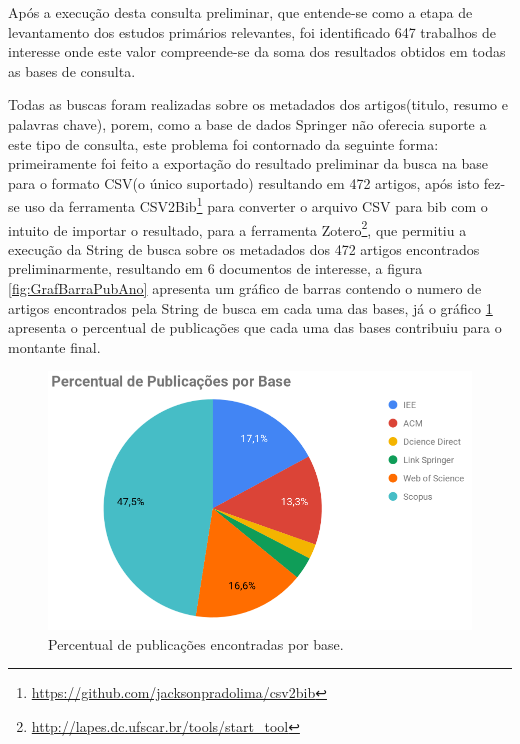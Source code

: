 \documentclass[tid,table]{texufpel} %
\begin{document}
Após a execução desta consulta preliminar, que entende-se como a etapa de levantamento dos estudos primários relevantes, foi identificado 647 trabalhos de interesse onde este valor  compreende-se da soma dos resultados obtidos em todas as bases de consulta.

Todas as buscas foram realizadas sobre os metadados dos artigos(titulo, resumo e palavras chave), porem, como a base de dados Springer não oferecia suporte a este tipo de consulta, este problema foi contornado da seguinte forma: primeiramente foi feito a exportação do resultado preliminar da busca na base para o formato CSV(o único suportado) resultando em 472 artigos, após isto fez-se uso da ferramenta CSV2Bib\footnote{\url{https://github.com/jacksonpradolima/csv2bib}} para converter o arquivo CSV para bib com o intuito de importar o resultado, para a ferramenta Zotero\footnote{\url{http://lapes.dc.ufscar.br/tools/start_tool}}, que permitiu a execução da String de busca sobre os metadados dos 472 artigos encontrados preliminarmente, resultando em 6 documentos de interesse, a figura  \ref{fig:GrafBarraPubAno} apresenta um gráfico de barras contendo o numero de artigos encontrados pela String de busca em cada uma das bases, já o gráfico \ref{fig:GrafPizPubAno} apresenta o percentual de publicações que cada uma das bases contribuiu para o montante final.

\begin{figure}[ht]
	\centering
	\includegraphics[width=.9\textwidth]{imagens/GrafPizPubAno.png}
	\caption{Percentual de publicações encontradas por base.}
	\label{fig:GrafPizPubAno}
\end{figure}
\end{document}
